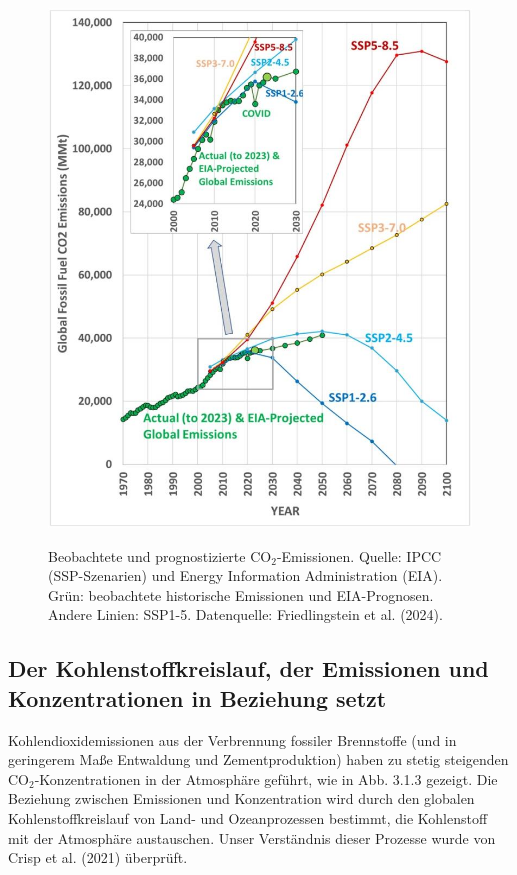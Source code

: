 \documentclass[12pt,paper=a4,DIV=12,parskip=never,chapterprefix=false,headings=standardclasses]{scrreprt}
\numberwithin{figure}{chapter}
\begin{document}
\begin{figure}[H]
\begin{center}
\includegraphics[width=1.0\textwidth]{bilder/bilderKlima-0012.jpg}\\[1cm]
\end{center}
\caption{Beobachtete und prognostizierte CO$_2$-Emissionen. Quelle: IPCC (SSP-Szenarien) und
Energy Information Administration (EIA). Grün: beobachtete historische Emissionen und EIA-Prognosen.
Andere Linien: SSP1-5. Datenquelle: Friedlingstein et al. (2024).}
\end{figure}

\subsection{Der Kohlenstoffkreislauf, der Emissionen und Konzentrationen in Beziehung setzt}
Kohlendioxidemissionen aus der Verbrennung fossiler Brennstoffe (und in geringerem Maße Entwaldung und Zementproduktion) haben zu stetig steigenden CO$_2$-Konzentrationen in der Atmosphäre geführt, wie in Abb. 3.1.3 gezeigt. Die Beziehung zwischen Emissionen und Konzentration wird durch den globalen Kohlenstoffkreislauf von Land- und Ozeanprozessen bestimmt, die Kohlenstoff mit der Atmosphäre austauschen. Unser Verständnis dieser Prozesse wurde von Crisp et al. (2021) überprüft.
\end{document}
